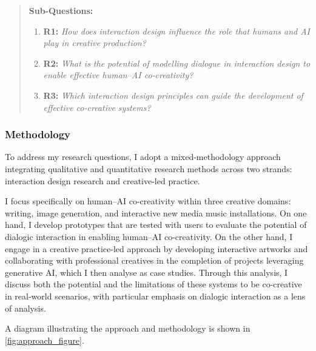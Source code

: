 \begin{quote}
\textbf{Sub-Questions:}
\begin{enumerate}
    \item \textbf{R1:} \emph{How does interaction design influence the role that humans and AI play in creative production?}
    \item \textbf{R2:} \emph{What is the potential of modelling dialogue in interaction design to enable effective human–AI co-creativity?}
    \item \textbf{R3:} \emph{Which interaction design principles can guide the development of effective co-creative systems?}
\end{enumerate}
\end{quote}

\subsubsection{Methodology}
To address my research questions, I adopt a mixed-methodology approach integrating qualitative and quantitative research methods across two strands: interaction design research and creative-led practice.

I focus specifically on human–AI co-creativity within three creative domains: writing, image generation, and interactive new media music installations. On one hand, I develop prototypes that are tested with users to evaluate the potential of dialogic interaction in enabling human–AI co-creativity. On the other hand, I engage in a creative practice-led approach by developing interactive artworks and collaborating with professional creatives in the completion of projects leveraging generative AI, which I then analyse as case studies. Through this analysis, I discuss both the potential and the limitations of these systems to be co-creative in real-world scenarios, with particular emphasis on dialogic interaction as a lens of analysis.

A diagram illustrating the approach and methodology is shown in \ref{fig:approach_figure}.

